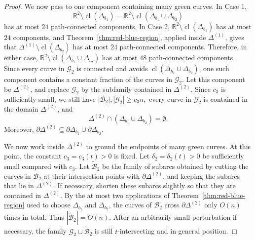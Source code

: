 \documentclass[11pt]{article}
\theoremstyle{plain}
\theoremstyle{definition}
\theoremstyle{remark}
\begin{document}
\begin{proof}
We now pass to one component containing many green curves. In Case 1,
\[
\mathbb R^2\setminus\operatorname{cl}(\Delta_{b_1})
=
\mathbb R^2\setminus\operatorname{cl}(\Delta_{b_1}\cup\Delta_{b_2})
\]
has at most \(24\) path-connected components. In Case 2,
\(\mathbb R^2\setminus\operatorname{cl}(\Delta_{b_1})\) has at most \(24\)
components, and Theorem~\ref{thm:red-blue-region}, applied inside
\(\Delta^{(1)}\), gives that $\Delta^{(1)}\setminus\operatorname{cl}(\Delta_{b_2})$ has at most \(24\) path-connected components. Therefore, in either case, $\mathbb R^2\setminus
\operatorname{cl}(\Delta_{b_1}\cup\Delta_{b_2})$ has at most 48 path-connected components. Since
every curve in \(\mathcal G_2\) is connected and avoids
\(\operatorname{cl}(\Delta_{b_1}\cup\Delta_{b_2})\), one such component
contains a constant fraction of the curves in \(\mathcal G_2\). Let this
component be \(\Delta^{(2)}\), and replace \(\mathcal G_2\) by the subfamily
contained in \(\Delta^{(2)}\). Since \(c_3\) is sufficiently small, we still have $
|\mathcal B_2|,|\mathcal G_2|\ge c_3n,$ every curve in \(\mathcal G_2\) is contained in the domain \(\Delta^{(2)}\),
and
\[
\Delta^{(2)}\cap(\Delta_{b_1}\cup\Delta_{b_2})=\emptyset.
\]
Moreover, $\partial\Delta^{(2)}
\subseteq
\partial\Delta_{b_1}\cup\partial\Delta_{b_2}.$

We now work inside \(\Delta^{(2)}\) to ground the endpoints of many green
curves. At this point, the constant \(c_3=c_3(t)>0\) is fixed. Let \(\delta_2=\delta_2(t)>0\) be sufficiently small compared with \(c_3\).   Let \(\widetilde{\mathcal B}_2\) be the family of subarcs obtained by
cutting the curves in \(\mathcal B_2\) at their intersection points with
\(\partial\Delta^{(2)}\), and keeping the subarcs that lie in
\(\Delta^{(2)}\). If necessary, shorten these subarcs slightly so that they
are contained in \(\Delta^{(2)}\). By the
at most two applications of Theorem~\ref{thm:red-blue-region} used to choose
\(\Delta_{b_1}\) and \(\Delta_{b_2}\), the curves of
\(\mathcal B_2\) cross \(\partial\Delta^{(2)}\) only \(O(n)\) times in total.
Thus $|\widetilde{\mathcal B}_2|=O(n).$  After an arbitrarily small perturbation if necessary,
the family \(\mathcal G_2\cup\widetilde{\mathcal B}_2\) is still
\(t\)-intersecting and in general position.


\end{proof}
\end{document}
